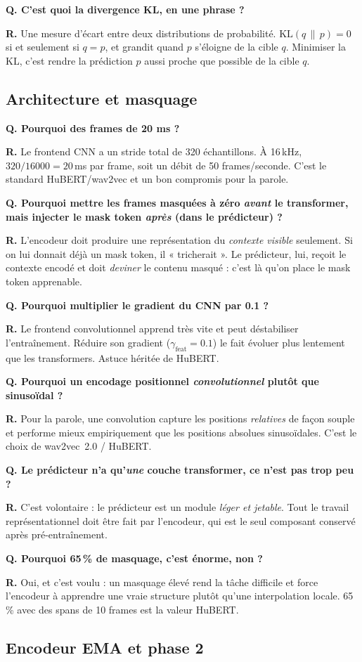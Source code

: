 \documentclass[11pt,a4paper]{article}
\newcommand{\faq}[2]{%
  \par\medskip
  \begin{faqbox}
  \textbf{Q. #1}\par\smallskip
  \textbf{R.} #2
  \end{faqbox}
}
\begin{document}
\faq{C'est quoi la divergence KL, en une phrase ?}{%
Une mesure d'écart entre deux distributions de probabilité.
$\mathrm{KL}(q\,\|\,p)=0$ si et seulement si $q=p$, et grandit quand $p$
s'éloigne de la cible $q$. Minimiser la KL, c'est rendre la prédiction $p$
aussi proche que possible de la cible $q$.}

\subsection{Architecture et masquage}

\faq{Pourquoi des frames de 20 ms ?}{%
Le frontend CNN a un stride total de 320 échantillons. À 16\,kHz,
$320/16000 = 20$\,ms par frame, soit un débit de 50 frames/seconde. C'est
le standard HuBERT/wav2vec et un bon compromis pour la parole.}

\faq{Pourquoi mettre les frames masquées à zéro \emph{avant} le transformer,
mais injecter le mask token \emph{après} (dans le prédicteur) ?}{%
L'encodeur doit produire une représentation du \emph{contexte visible}
seulement. Si on lui donnait déjà un mask token, il « tricherait ». Le
prédicteur, lui, reçoit le contexte encodé et doit \emph{deviner} le
contenu masqué : c'est là qu'on place le mask token apprenable.}

\faq{Pourquoi multiplier le gradient du CNN par 0.1 ?}{%
Le frontend convolutionnel apprend très vite et peut déstabiliser
l'entraînement. Réduire son gradient ($\gamma_\text{feat}=0.1$) le fait
évoluer plus lentement que les transformers. Astuce héritée de HuBERT.}

\faq{Pourquoi un encodage positionnel \emph{convolutionnel} plutôt que
sinusoïdal ?}{%
Pour la parole, une convolution capture les positions \emph{relatives} de
façon souple et performe mieux empiriquement que les positions absolues
sinusoïdales. C'est le choix de wav2vec~2.0 / HuBERT.}

\faq{Le prédicteur n'a qu'\emph{une} couche transformer, ce n'est pas
trop peu ?}{%
C'est volontaire : le prédicteur est un module \emph{léger et jetable}.
Tout le travail représentationnel doit être fait par l'encodeur, qui est
le seul composant conservé après pré-entraînement.}

\faq{Pourquoi 65\,\% de masquage, c'est énorme, non ?}{%
Oui, et c'est voulu : un masquage élevé rend la tâche difficile et force
l'encodeur à apprendre une vraie structure plutôt qu'une interpolation
locale. 65\,\% avec des spans de 10 frames est la valeur HuBERT.}

\subsection{Encodeur EMA et phase 2}
\end{document}
